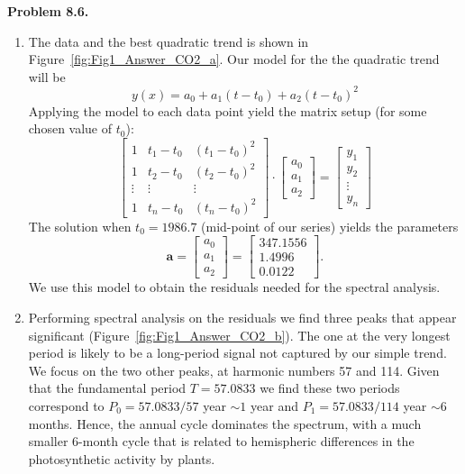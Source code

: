\noindent
\bf{Problem 8.6.} \\
\begin{enumerate}[label=\alph*)]
\item  The data and the best quadratic trend is shown in Figure~\ref{fig:Fig1_Answer_CO2_a}.
Our model for the the quadratic trend will be
$$
y(x) = a_0 + a_1 (t-t_0) + a_2 (t-t_0)^2
$$
Applying the model to each data point yield the matrix setup (for some chosen value of $t_0$):
$$
\left [ \begin{array}{ccc}
1 & t_1-t_0 & (t_1-t_0)^2 \\
1 & t_2-t_0 & (t_2-t_0)^2 \\
\vdots & \vdots & \vdots \\
1 & t_n-t_0 & (t_n-t_0)^2
\end{array} \right ] \cdot \left [
\begin{array}{c}
a_0 \\
a_1 \\
a_2
\end{array} \right ] = \left [
\begin{array}{c}
y_1 \\
y_2 \\
\vdots \\
y_n
\end{array} \right ]
$$
The solution when $t_0 = 1986.7$ (mid-point of our series) yields the parameters
$$
\mathbf{a} =  \left [
\begin{array}{c}
a_0 \\
a_1 \\
a_2
\end{array} \right ]
=  \left [
\begin{array}{r}
347.1556 \\
 1.4996 \\
 0.0122
\end{array} \right ].
$$
We use this model to obtain the residuals needed for the spectral analysis.

\item Performing spectral analysis on the residuals we find three peaks that appear significant
(Figure~\ref{fig:Fig1_Answer_CO2_b}).  The one at
the very longest period is likely to be a long-period signal not captured by our simple trend.  We focus on the two
other peaks, at harmonic numbers 57 and 114.  Given that the fundamental period $T = 57.0833$ we find these
two periods correspond to $P_0 = 57.0833/57$ year $\sim 1$ year and $P_1 = 57.0833/114$ year $\sim 6$ months.
Hence, the annual cycle dominates the spectrum, with a much smaller 6-month cycle that is related to hemispheric
differences in the photosynthetic activity by plants.
\end{enumerate}



